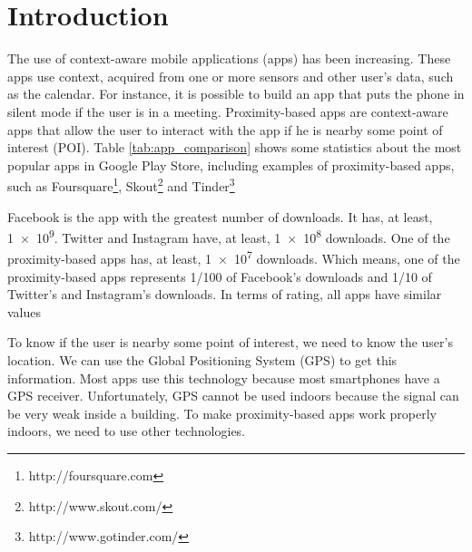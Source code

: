 
%
%

\section{Introduction}
\label{sec:introduction}


The use of context-aware mobile applications (apps)
has been increasing.
These apps use context, acquired
from one or more sensors and other user's data, 
such as the calendar. For instance, it is possible to
build an app that puts the phone in silent mode if the
user is in a meeting. Proximity-based apps are
context-aware apps that allow the user to interact
with the app if he is nearby some point of interest (POI).
Table \ref{tab:app_comparison} shows some statistics
about the most popular apps in Google Play Store,
including examples of proximity-based apps,
such as Foursquare\footnote{http://foursquare.com},
Skout\footnote{http://www.skout.com/} and
Tinder\footnote{http://www.gotinder.com/}



Facebook is the app with the
greatest number of downloads.
It has, at least, \num{1e9}. Twitter and Instagram
have, at least, \num{1e8} downloads.
One of the 
proximity-based apps has, at least, \num{1e7} downloads.
Which means, one of
the proximity-based apps represents
1/100 of Facebook's downloads and 1/10 of Twitter's
and Instagram's downloads. In terms of rating, all apps
have similar values

To know if the user is nearby some point of interest,
we need to know the user's location. We can use 
the Global Positioning System 
(GPS)\cite{masumoto1993global} to
get this information. Most apps use this technology 
because most smartphones have a GPS receiver. 
Unfortunately, GPS cannot be used indoors because 
the signal can
be very weak inside a building. To make proximity-based
apps work properly indoors, we need to use other 
technologies.

